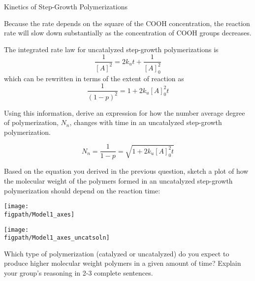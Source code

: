 \begin{activity}{Kinetics of Step-Growth Polymerizations}
\begin{ctqs}
\begin{enumerate}
				\begin{solution}[0.75in]	{}
					Because the rate depends on the square of the COOH concentration, the reaction rate will slow down substantially as the concentration of COOH groups decreases.
				\end{solution}
			
		\end{enumerate}
	
\end{ctqs}

\begin{infobox}\label{\labelbase:info:uncatintrate}
	The integrated rate law for uncatalyzed step-growth polymerizations is
	\begin{equation*}
		\frac{1}{[A]^2} = 2k_u t + \frac{1}{[A]_0^2}
	\end{equation*}
	which can be rewritten in terms of the extent of reaction as
	\begin{equation*}
		\frac{1}{(1-p)^2} = 1 + 2k_u [A]_0^2 t
	\end{equation*}
\end{infobox}

\begin{ctqs}

	\question Using this information, derive an expression for how the number average degree of polymerization, $N_n$, changes with time in an uncatalyzed step-growth polymerization.
	
		\begin{solution}[1.25in]{}
			\begin{equation*}
				N_n = \frac{1}{1-p} = \sqrt{1 + 2k_u [A]_0^2 t}
			\end{equation*}
		\end{solution}
		
	\question Based on the equation you derived in the previous question, sketch a plot of how the molecular weight of the polymers formed in an uncatalyzed step-growth polymerization should depend on the reaction time:
	
		\begin{solution}[2in]{		
			\centerline{\texttt{[image: \\figpath/Model1\_axes]}}
		}
			\centerline{\texttt{[image: \\figpath/Model1\_axes\_uncatsoln]}}
		
		\end{solution}		
		
	\question Which type of polymerization (catalyzed or uncatalyzed) do you expect to produce higher molecular weight polymers in a given amount of time?  Explain your group's reasoning in 2-3 complete sentences.
	

\end{ctqs}
\end{activity}
